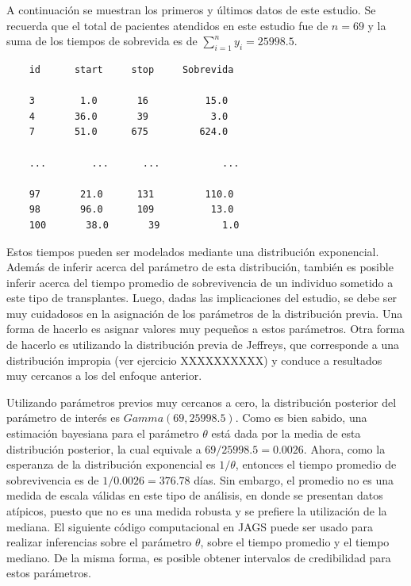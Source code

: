 \begin{Eje}
    A continuaci\'on se muestran los primeros y \'ultimos datos de este estudio. Se recuerda que el total de pacientes atendidos en este estudio fue de $n=69$ y la suma de los tiempos de sobrevida es de $\sum_{i=1}^ny_i=25998.5$.
    
    \begin{verbatim}
    id      start     stop     Sobrevida
    
    3        1.0       16          15.0
    4       36.0       39           3.0
    7       51.0      675         624.0
    
    ...        ...      ...           ...
    
    97       21.0      131         110.0
    98       96.0      109          13.0
    100       38.0       39           1.0
    \end{verbatim}
    
    Estos tiempos pueden ser modelados mediante una distribuci\'on exponencial. Adem\'as de inferir acerca del par\'ametro de esta distribuci\'on, tambi\'en es posible inferir acerca del tiempo promedio de sobrevivencia de un individuo sometido a este tipo de transplantes. Luego, dadas las implicaciones del estudio, se debe ser muy cuidadosos en la asignaci\'on de los par\'ametros de la distribuci\'on previa. Una forma de hacerlo es asignar valores muy peque\~nos a estos par\'ametros. Otra forma de hacerlo es utilizando la distribuci\'on previa de Jeffreys, que corresponde a una distribuci\'on impropia (ver ejercicio XXXXXXXXXX) y conduce a resultados muy cercanos a los del enfoque anterior.
    
    Utilizando par\'ametros previos muy cercanos a cero, la distribuci\'on posterior del par\'ametro de inter\'es es $Gamma(69, 25998.5)$. Como es bien sabido, una estimaci\'on bayesiana para el par\'ametro $\theta$ est\'a dada por la media de esta distribuci\'on posterior, la cual equivale a $69/25998.5=0.0026$. Ahora, como la esperanza de la distribuci\'on exponencial es $1/\theta$, entonces el tiempo promedio de sobrevivencia es de $1/0.0026=376.78$ d\'ias. Sin embargo, el promedio no es una medida de escala v\'alidas en este tipo de an\'alisis, en donde se presentan datos at\'ipicos, puesto que no es una medida robusta y se prefiere la utilizaci\'on de la mediana. El siguiente c\'odigo computacional en JAGS puede ser usado para realizar inferencias sobre el par\'ametro $\theta$, sobre el tiempo promedio y el tiempo mediano. De la misma forma, es posible obtener intervalos de credibilidad para estos par\'ametros.
    

\end{Eje}
